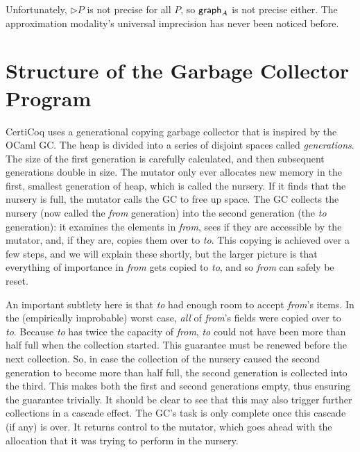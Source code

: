 Unfortunately, $\rhd P$ is not precise for all $P$, so $\mathsf{graph}_A$ is not precise either.  The approximation modality's universal imprecision has never been noticed before.

\section{Structure of the Garbage Collector Program}
\label{apx:gcstructure}


CertiCoq uses a generational copying garbage collector 
that is inspired by the OCaml GC. 
The heap is divided into a series of disjoint
spaces called \emph{generations}. The size of the first generation
is carefully calculated, and then subsequent generations
double in size.
The mutator only ever allocates new memory in the first, 
smallest generation of heap, which is called the nursery. 
If it finds that the nursery is full, 
the mutator calls the GC to free up space.
The GC collects the nursery 
(now called the \emph{from} generation)
into the second generation (the \emph{to} generation): 
it examines the elements 
in \emph{from}, sees if they are accessible by
the mutator, and, if they are, 
copies them over to \emph{to}. This copying is achieved over a few steps, 
and we will explain these shortly, but the larger picture is that 
everything of importance in \emph{from} gets copied to \emph{to}, 
and so \emph{from} can safely be reset. 

An important subtlety here is that \emph{to} had enough 
room to accept \emph{from}'s items. 
In the (empirically improbable) worst case, 
\emph{all} of \emph{from}'s fields were copied over to \emph{to}.
Because \emph{to} has twice the capacity of \emph{from},
\emph{to} could not have been more than half full when 
the collection started.
This guarantee must be renewed before the next collection. 
So, in case the collection of the nursery caused
the second generation to become more than half full, 
the second generation is collected into the third. This makes 
both the first and second generations empty, thus ensuring 
the guarantee trivially. It should be 
clear to see that this may also trigger further collections in 
a cascade effect. The GC's task is only complete once this 
cascade (if any) is over. It returns control to the mutator,
which goes ahead with 
the allocation that it was trying to perform in the nursery.

